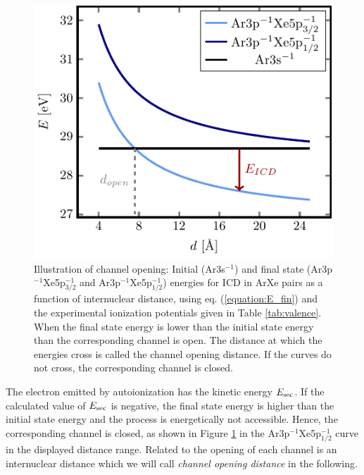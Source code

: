 \begin{figure}[h]
 \centering
 \includegraphics[width=\columnwidth]{pics/channel_open_ICD.pdf}
 \caption{Illustration of channel opening: Initial (Ar3s$^{-1}$)
          and final state (Ar3p$^{-1}$Xe5p$_{3/2}^{-1}$ and
          Ar3p$^{-1}$Xe5p$_{1/2}^{-1}$) energies
          for ICD in ArXe pairs as a function of 
          internuclear distance, using eq. (\ref{equation:E_fin})
          and the experimental ionization
          potentials given
          in Table \ref{tab:valence}. When the final state energy is lower
          than the initial state energy than the corresponding channel
          is open. The distance at which the energies cross is called the
          channel opening distance. If the curves do not cross, the
          corresponding channel is closed.}
 \label{figure:channel_open_ICD}
\end{figure}

The electron emitted by autoionization has the kinetic energy $E_{\rm sec}$. 
If the calculated value of $E_{\rm sec}$ is negative,
the final state energy is higher than the initial state energy and the        
process is energetically not accessible. Hence, the corresponding channel     
is closed, as shown in Figure \ref{figure:channel_open_ICD} in the
Ar3p$^{-1}$Xe5p$_{1/2}^{-1}$ curve in the displayed distance range. Related to
the opening of each channel is an internuclear distance which we will call 
\emph{channel opening distance} in the following.
                                                               
